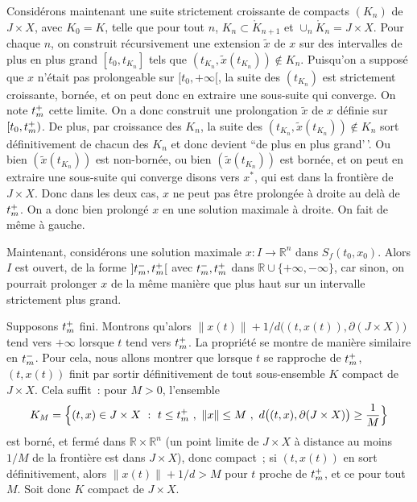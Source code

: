 Considérons maintenant une suite strictement croissante de compacts
\((K_n)\) de \(J\times X\), avec \(K_0=K\), telle que pour tout \(n\),
\(K_n \subset \mathring{K}_{n+1}\) et
\(\cup_n \mathring{K}_{n} = J\times X\). Pour chaque \(n\),
on construit récursivement une extension \(\tilde{x}\) de \(x\) sur des
intervalles de plus en plus grand \([t_0,t_{K_n}]\) tels que
\((t_{K_n},\tilde{x}(t_{K_n})) \notin K_n\). Puisqu'on a supposé que
\(x\) n'était pas prolongeable sur \([t_0,+\infty[\), la suite des
\((t_{K_n})\) est strictement croissante, bornée, et on peut donc en
extraire une sous-suite qui converge. On note \(t_m^+\) cette limite. On
a donc construit une prolongation \(\tilde{x}\) de \(x\) définie sur
\([t_0,t_m^+)\). De plus, par croissance des \(K_n\), la suite des
\((t_{K_n},\tilde{x}(t_{K_n})) \notin K_n\) sort définitivement de
chacun des \(K_n\) et donc devient ``de plus en plus grand'\,'. Ou bien
\((\tilde{x}(t_{K_n}))\) est non-bornée, ou bien
\((\tilde{x}(t_{K_n}))\) est bornée, et on peut en extraire une
sous-suite qui converge disons vers \(x^*\), qui est dans la frontière
de \(J\times X\). Donc dans les deux cas, \(x\) ne peut pas être
prolongée à droite au delà de \(t_m^+\). On a donc bien prolongé \(x\)
en une solution maximale à droite. On fait de même à gauche.

Maintenant, considérons une solution maximale \(x: I \to \mathbb{R}^n\)
dans \(S_f(t_0,x_0)\). Alors \(I\) est ouvert, de la forme
\(]t_m^-,t_m^+[\) avec \(t_m^-,t_m^+\) dans
\(\mathbb{R}\cup \{+\infty,-\infty\}\), car sinon, on pourrait prolonger
\(x\) de la même manière que plus haut sur un intervalle strictement
plus grand.

Supposons \(t_m^+\) fini. Montrons qu'alors
\(\|x(t)\| + 1/d\big((t,x(t)),\partial (J\times X)\big)\) tend vers
\(+\infty\) lorsque \(t\) tend vers \(t_m^+\). La propriété se montre de
manière similaire en \(t_m^-\). Pour cela, nous allons montrer que
lorsque \(t\) se rapproche de \(t_m^+\), \((t,x(t))\) finit par sortir
définitivement de tout sous-ensemble \(K\) compact de \(J\times X\).
Cela suffit~: pour \(M>0\), l'ensemble \[
K_M = \Big\{(t,x)\in J\times X \ : \ t\leq \tmax \ , \ \|x\|\leq M \ , \ d\big((t,x),\partial (J\times X)\big)\geq \frac{1}{M}\Big\}
\] est borné, et fermé dans \(\mathbb{R}\times\mathbb{R}^n\) (un point
limite de \(J\times X\) à distance au moins \(1/M\) de la frontière est
dans \(J\times X\)), donc compact~; si \((t,x(t))\) en sort
définitivement, alors \(\|x(t)\| + 1/d > M\) pour \(t\) proche de
\(t_m^+\), et ce pour tout \(M\). Soit donc \(K\) compact de
\(J\times X\).

